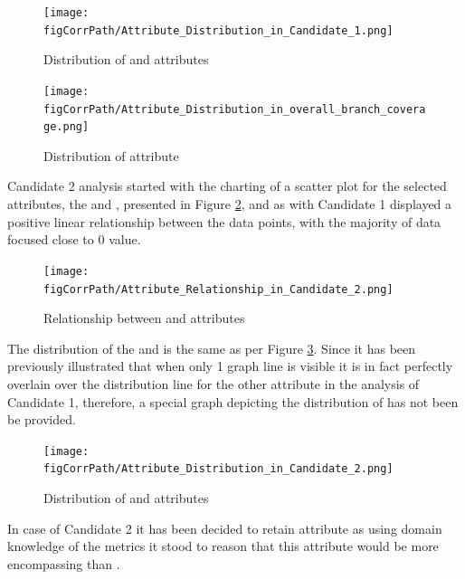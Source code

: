 \begin{enumerate}
\begin{landscape}
\begin{figure}
\centering
\begin{minipage}{0.89\textwidth}
  \centering
  \texttt{[image: \\figCorrPath/Attribute\_Distribution\_in\_Candidate\_1.png]}
    \caption{Distribution of \overallBranchCoverage{} and \branchCoverage{} attributes}
    \label{fig:candidate1-distribution}
\end{minipage}%
\begin{minipage}{0.89\textwidth}
   \texttt{[image: \\figCorrPath/Attribute\_Distribution\_in\_overall\_branch\_coverage.png]}
    \caption{Distribution of \overallBranchCoverage{} attribute}
    \label{fig:candidate1-attrib2-distribution}
\end{minipage}
\end{figure}
\end{landscape}
\FloatBarrier

Candidate 2 analysis started with the charting of a scatter plot for the selected attributes, the \overallUncoveredLines{} and \uncoveredLines{}, presented in Figure \ref{fig:candidate2-scatterplot}, and as with Candidate 1 displayed a positive linear relationship between the data points, with the majority of data focused close to 0 value.

\begin{figure}[!h]
    \centering
    \texttt{[image: \\figCorrPath/Attribute\_Relationship\_in\_Candidate\_2.png]}
    \caption{Relationship between \overallUncoveredLines{} and \uncoveredLines{} attributes}
    \label{fig:candidate2-scatterplot}
\end{figure}

The distribution of the \overallUncoveredLines{} and \uncoveredLines{} is the same as per Figure \ref{fig:candidate2-distribution}. Since it has been previously illustrated that when only 1 graph line is visible it is in fact perfectly overlain over the distribution line for the other attribute in the analysis of Candidate 1, therefore, a special graph depicting the distribution of \uncoveredLines{} has not been be provided.
\begin{figure}
    \centering
  \texttt{[image: \\figCorrPath/Attribute\_Distribution\_in\_Candidate\_2.png]}
    \caption{Distribution of \overallUncoveredLines{} and \uncoveredLines{} attributes}
    \label{fig:candidate2-distribution}
\end{figure}
In case of Candidate 2 it  has been decided to retain \overallUncoveredLines{} attribute as using domain knowledge of the metrics it stood to reason that this attribute would be more encompassing than \uncoveredLines{}.
\FloatBarrier


\end{enumerate}
